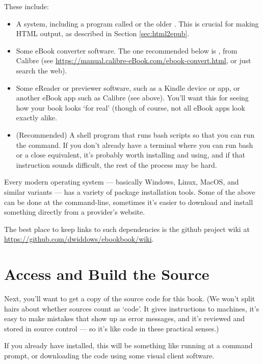 These include:

\begin{itemize}
\item A \latex system, including a program called  or the older .
  This is crucial for making HTML output, as described in Section
  \ref{sec:html2epub}.
\item Some eBook converter software. The one recommended below is
  , from Calibre (see
  {\small \url{https://manual.calibre-eBook.com/ebook-convert.html}}, or just
  search the web).
\item Some eReader or previewer software, such as a Kindle device or
  app, or another eBook app such as Calibre (see above). You'll want
  this for seeing how your book looks `for real' (though of course,
  not all eBook apps look exactly alike.
\item (Recommended) A shell program that runs bash scripts so that you
  can run the  command. If you don't already have a
  terminal where you can run bash or a close equivalent, it's probably
  worth installing and using, and if that instruction sounds
  difficult, the rest of the process may be hard.
\end{itemize}

Every modern operating system --- basically Windows, Linux, MacOS, and
similar variants --- has a variety of package installation tools.
Some of the above can be done at the command-line, sometimes it's
easier to download and install something directly from a provider's
website.

The best place to keep links to such dependencies is the 
github project wiki at {\small \url{https://github.com/dwiddows/ebookbook/wiki}}.

\section{Access and Build the \latex Source}

Next, you'll want to get a copy of the source code for this
book. (We won't split hairs about whether \latex sources count as
`code'. It gives instructions to machines, it's easy to make mistakes
that show up as error messages, and it's reviewed and stored in source
control --- so it's like code in these practical senses.)

If you already have  installed, this will be something
like running  at a command prompt, or
downloading the code using some visual client software. 

